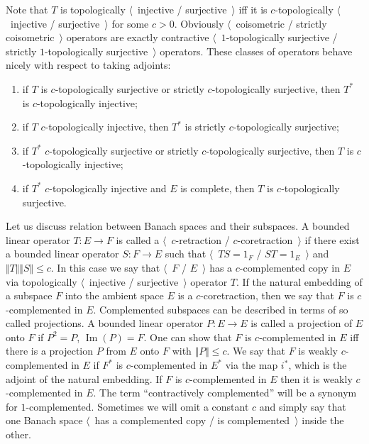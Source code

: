 Note that $T$ is topologically $\langle$~injective / surjective~$\rangle$ iff it
is $c$-topologically $\langle$~injective / surjective~$\rangle$ for some $c>0$.
Obviously $\langle$~coisometric / strictly coisometric~$\rangle$ operators are
exactly contractive $\langle$~$1$-topologically surjective / strictly
$1$-topologically surjective~$\rangle$ operators. These classes of operators 
behave nicely with respect to taking adjoints:

\begin{enumerate}[label = (\roman*)]
  \item if $ T$ is $c$-topologically surjective or strictly $c$-topologically 
  surjective, then $ T^*$ is $c$-topologically injective;

  \item if $ T$ $c$-topologically injective, then $ T^*$ is strictly
  $c$-topologically surjective;

  \item if $ T^*$ $c$-topologically surjective or strictly $c$-topologically 
  surjective, then $ T$ is $c$-topologically injective;

  \item if $T^*$ $c$-topologically injective and $E$ is complete, then $T$ 
  is $c$-topologically surjective.
\end{enumerate}

Let us discuss relation between Banach spaces and their subspaces. A bounded 
linear operator $T:E\to F$ is called a $\langle$~$c$-retraction /
$c$-coretraction~$\rangle$ if there exist a bounded linear operator $S:F\to E$
such that $\langle$~$T S=1_F$ / $S T=1_E$~$\rangle$ 
and $\Vert T\Vert\Vert S\Vert\leq c$. In this case we say 
that $\langle$~$F$ / $E$~$\rangle$ has a
$c$-complemented copy in $E$ via topologically $\langle$~injective /
surjective~$\rangle$ operator $T$. If the natural embedding of a subspace $F$
into the ambient space $E$ is a $c$-coretraction, then we say that $F$ is
$c$-complemented in $E$. Complemented subspaces can be described in terms of so
called projections. A bounded linear operator $P:E\to E$ is called a projection 
of $E$ onto $F$ if $P^2=P$, $\operatorname{Im}(P)=F$. One can show that 
$F$ is $c$-complemented in $E$ iff there is a projection $P$ from $E$ onto $F$ 
with $\Vert P\Vert\leq c$. We say that $F$ is weakly $c$-complemented in $E$
if $F^*$ is $c$-complemented in $E^*$ via the map $i^*$, which is the adjoint of
the natural embedding. If $F$ is $c$-complemented in $E$ then it is 
weakly $c$-complemented in $E$.  The term ``contractively complemented'' will 
be a synonym for $1$-complemented. Sometimes we will omit a constant $c$ and 
simply say that one Banach space $\langle$~has a complemented copy / 
is complemented~$\rangle$ inside the other. 

